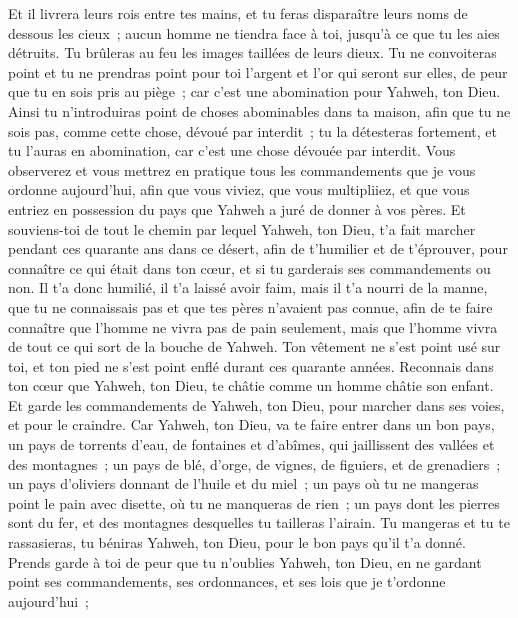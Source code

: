 \begin{multicols}{2}
Et il livrera leurs rois entre tes mains, et tu feras disparaître leurs noms de dessous les cieux~; aucun homme ne tiendra face à toi, jusqu'à ce que tu les aies détruits.
Tu brûleras au feu les images taillées de leurs dieux. Tu ne convoiteras point et tu ne prendras point pour toi l'argent et l'or qui seront sur elles, de peur que tu en sois pris au piège~; car c'est une abomination pour Yahweh, ton Dieu.
Ainsi tu n'introduiras point de choses abominables dans ta maison, afin que tu ne sois pas, comme cette chose, dévoué par interdit~; tu la détesteras fortement, et tu l'auras en abomination, car c'est une chose dévouée par interdit.
\VerseOne{}Vous observerez et vous mettrez en pratique tous les commandements que je vous ordonne aujourd'hui, afin que vous viviez, que vous multipliiez, et que vous entriez en possession du pays que Yahweh a juré de donner à vos pères.
Et souviens-toi de tout le chemin par lequel Yahweh, ton Dieu, t'a fait marcher pendant ces quarante ans dans ce désert, afin de t'humilier et de t'éprouver, pour connaître ce qui était dans ton cœur, et si tu garderais ses commandements ou non.
Il t'a donc humilié, il t'a laissé avoir faim, mais il t'a nourri de la manne, que tu ne connaissais pas et que tes pères n'avaient pas connue, afin de te faire connaître que l'homme ne vivra pas de pain seulement, mais que l'homme vivra de tout ce qui sort de la bouche de Yahweh.
Ton vêtement ne s'est point usé sur toi, et ton pied ne s'est point enflé durant ces quarante années.
Reconnais dans ton cœur que Yahweh, ton Dieu, te châtie comme un homme châtie son enfant.
Et garde les commandements de Yahweh, ton Dieu, pour marcher dans ses voies, et pour le craindre.
Car Yahweh, ton Dieu, va te faire entrer dans un bon pays, un pays de torrents d'eau, de fontaines et d'abîmes, qui jaillissent des vallées et des montagnes~;
un pays de blé, d'orge, de vignes, de figuiers, et de grenadiers~; un pays d'oliviers donnant de l'huile et du miel~;
un pays où tu ne mangeras point le pain avec disette, où tu ne manqueras de rien~; un pays dont les pierres sont du fer, et des montagnes desquelles tu tailleras l'airain.
Tu mangeras et tu te rassasieras, tu béniras Yahweh, ton Dieu, pour le bon pays qu'il t'a donné.
Prends garde à toi de peur que tu n'oublies Yahweh, ton Dieu, en ne gardant point ses commandements, ses ordonnances, et ses lois que je t'ordonne aujourd'hui~;

\end{multicols}
